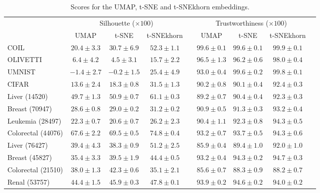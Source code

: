 \begin{table}\centering
\caption{Scores for the UMAP, t-SNE and t-SNEkhorn embeddings.}
\vskip 0.1in
\begin{small}
\begin{tabular}{@{\hskip 0.1in}l@{\hskip 0.1in}c@{\hskip 0.1in}c@{\hskip 0.1in}c@{\hskip 0.1in}c@{\hskip 0.1in}c@{\hskip 0.1in}c@{\hskip 0.1in}c@{\hskip 0.1in}c@{\hskip 0.1in}}
    \toprule[1.5pt]
& \multicolumn{3}{c}{Silhouette ($\times 100$)} & & \multicolumn{3}{c}{Trustworthiness ($\times 100$)} \\
\cmidrule{2-4} \cmidrule{6-8}
& UMAP & t-SNE & t-SNEkhorn && UMAP & t-SNE & t-SNEkhorn \\ \midrule
COIL & $20.4\pm3.3$ & $30.7\pm6.9$ & $\mathbf{52.3\pm1.1}$ && $99.6\pm0.1$ & $99.6\pm0.1$ & $\mathbf{99.9\pm0.1}$ \\ 
OLIVETTI & $6.4\pm4.2$ & $4.5\pm3.1$ & $\mathbf{15.7\pm2.2}$ && $96.5\pm1.3$ & $96.2\pm0.6$ & $\mathbf{98.0\pm0.4}$ \\
UMNIST & $-1.4\pm2.7$ & $-0.2\pm1.5$ & $\mathbf{25.4\pm4.9}$ && $93.0\pm0.4$ & $99.6\pm0.2$ & $\mathbf{99.8\pm0.1}$ \\
CIFAR & $13.6\pm2.4$ & $18.3\pm0.8$ & $\mathbf{31.5\pm1.3}$ && $90.2\pm0.8$ & $90.1\pm0.4$ & $\mathbf{92.4\pm0.3}$ \\ \midrule[0.2pt]
Liver \tiny{(14520)} & $49.7\pm1.3$ & $50.9\pm0.7$ & $\mathbf{61.1\pm0.3}$ && $89.2\pm0.7$ & $90.4\pm0.4$ & $\mathbf{92.3\pm0.3}$ \\
Breast \tiny{(70947)} & $28.6\pm0.8$ & $29.0\pm0.2$ & $\mathbf{31.2\pm0.2}$ && $90.9\pm0.5$ & $91.3\pm0.3$ & $\mathbf{93.2\pm0.4}$ \\
Leukemia \tiny{(28497)} & $22.3\pm0.7$ & $20.6\pm0.7$ & $\mathbf{26.2\pm2.3}$ && $90.4\pm1.1$ & $92.3\pm0.8$ & $\mathbf{94.3\pm0.5}$ \\
Colorectal \tiny{(44076)} & $67.6\pm2.2$ & $69.5\pm0.5$ & $\mathbf{74.8\pm0.4}$ && $93.2\pm0.7$ & $93.7\pm0.5$ & $\mathbf{94.3\pm0.6}$ \\
Liver \tiny{(76427)} & $39.4\pm4.3$ & $38.3\pm0.9$ & $\mathbf{51.2\pm2.5}$ && $85.9\pm0.4$ & $89.4\pm1.0$ & $\mathbf{92.0\pm1.0}$ \\
Breast \tiny{(45827)} & $35.4\pm3.3$ & $39.5\pm1.9$ & $\mathbf{44.4\pm0.5}$ && $93.2\pm0.4$ & $94.3\pm0.2$ & $\mathbf{94.7\pm0.3}$ \\
Colorectal \tiny{(21510)} & $38.0\pm1.3$ & $\mathbf{42.3\pm0.6}$ & $35.1\pm2.1$ && $85.6\pm0.7$ & $\mathbf{88.3\pm0.9}$ & $88.2\pm0.7$ \\
Renal \tiny{(53757)} & $44.4\pm1.5$ & $45.9\pm0.3$ & $\mathbf{47.8\pm0.1}$ && $93.9\pm0.2$ & $\mathbf{94.6\pm0.2}$ & $94.0\pm0.2$ \\ 

\end{tabular}
\end{small}
\end{table}
